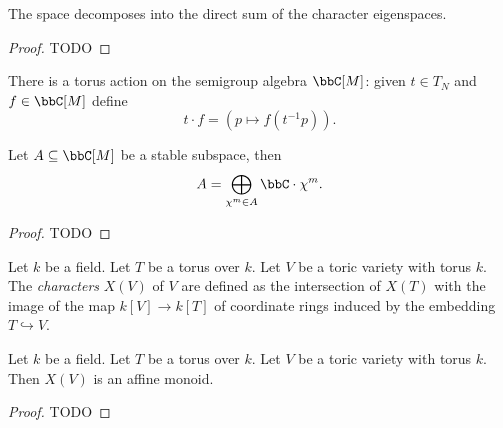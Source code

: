 \begin{proposition}
  \label{1-1-2-char-eigenspace-direct-sum}

  The space decomposes into the direct sum of the character eigenspaces.
\end{proposition}
\begin{proof}

  TODO
\end{proof}


\begin{definition}
  \label{1-1-tor-act-alg}

  There is a torus action on the semigroup algebra $\bbC[M]$: given $t\in T_N$ and $f\in \bbC[M]$ define
  \[
    t \cdot f = (p \mapsto f(t^{-1}p)).
  \]
\end{definition}


\begin{lemma}
  \label{1-1-16-total-red}
    Let $A \subseteq \bbC[M]$ be a stable subspace, then
    \[
      A = \bigoplus_{\chi^m \in A} \bbC \cdot \chi^m.
    \]
\end{lemma}
\begin{proof}

  TODO
\end{proof}


\begin{definition}
  \label{5-2-char-tor-var}

  Let $k$ be a field.
  Let $T$ be a torus over $k$.
  Let $V$ be a toric variety with torus $k$.
  The \emph{characters} $X(V)$ of $V$ are defined as the intersection of $X(T)$
  with the image of the map $k[V] \to k[T]$ of coordinate rings
  induced by the embedding $T \hookrightarrow V$.
\end{definition}


\begin{proposition}
  \label{5-2-char-tor-var-aff-mon}

  Let $k$ be a field.
  Let $T$ be a torus over $k$.
  Let $V$ be a toric variety with torus $k$.
  Then $X(V)$ is an affine monoid.
\end{proposition}
\begin{proof}

  TODO
\end{proof}



